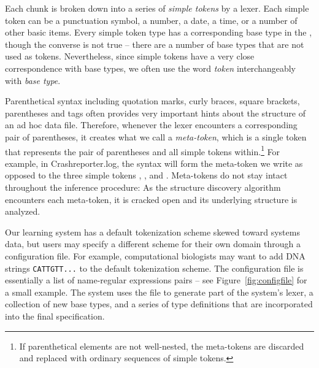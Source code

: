 Each chunk is broken down into a series of {\em simple tokens} by a lexer.
Each simple token can be a punctuation symbol, a number, a date, a time, or a
number of other basic items.  Every simple token type has a corresponding
base type in the \ir{}, though the converse is not true -- there are a
number of base types that are not used as tokens.  Nevertheless, since
simple tokens have a very close correspondence with base types,
we often use the word {\em token} interchangeably with {\em base type}.
  
Parenthetical syntax including quotation marks, curly braces, square brackets,
parentheses and \xml{} tags
often provides very important hints about the structure
of an ad hoc data file.  Therefore, whenever the lexer encounters 
a corresponding pair of parentheses, it 
creates what we call a {\em meta-token}, which is a single token that
represents the pair of parentheses and all simple tokens 
within.\footnote{If parenthetical elements
are not well-nested, the meta-tokens are discarded and replaced with
ordinary sequences of simple tokens.}  For example, in Crashreporter.log,
the syntax \cd{[2164]} will form the meta-token we write \cd{[*]} as
opposed to the three simple tokens \cd{[}, , and \cd{]}.  Meta-tokens
do not stay intact throughout the inference procedure:  As the structure 
discovery algorithm encounters each meta-token, it is cracked open and its 
underlying structure is analyzed.

Our learning system has a default tokenization scheme skewed toward systems
data, but users may specify a different scheme for their own domain
through a configuration file.  For example, computational biologists
may want to add DNA strings {\tt CATTGTT...} to the default tokenization 
scheme.  The configuration file is essentially
a list of name-regular expressions pairs -- see Figure~\ref{fig:configfile}
for a small example.  The system uses the file to generate 
part of the system's lexer, a
collection of new \ir{} base types, and a series of type 
definitions that are incorporated into the final \pads{} specification.  


